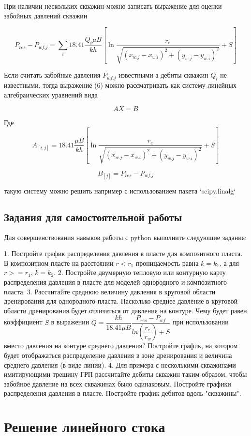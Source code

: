 \documentclass[a4paper,12pt]{article}
\begin{document}
	При наличии нескольких скважин можно записать выражение для оценки забойных давлений скважин
	
	
	$$
	P_{res} - P_{wf.j} =  \sum_{i} 18.41\dfrac{ Q_i\mu B }{kh} \left[ \ln\dfrac{r_e}{\sqrt{ (x_{w.j}-x_{w.i})^2 + (y_{w.j}-y_{w.i})^2 }} +S \right]
	$$
	
	Если считать забойные давления $P_{wf.j}$ известными а дебиты скважин $Q_i$ не известными, тогда выражение (6) можно рассматривать как систему линейных алгебраических уравнений вида
	
	$$AX = B$$
	
	Где
	$$
	A_{[i,j]} = 18.41\dfrac{ \mu B }{kh} \left[ \ln\dfrac{r_e}{\sqrt{ (x_{w.j}-x_{w.i})^2 + (y_{w.j}-y_{w.i})^2 }} +S \right]
	$$
	
	$$
	B_{[j]}=P_{res} - P_{wf.j}
	$$
	
	такую систему можно решить например с использованием пакета `scipy.linalg` 
	
	\subsection{Задания для самостоятельной работы}
	
	Для совершенствования навыков работы с python выполните следующие задания:
	
	1. Постройте график распределения давления в пласте для композитного пласта. В композитном пласте на расстоянии $r<r_1$ проницаемость равна $k=k_1$, а для $r>=r_1$, $k=k_2$. 
	2. Постройте двумерную тепловую или контурную карту распределения давления в пласте для моделей однородного и композитного пласта.
	3. Рассчитайте среднюю величину давления в круговой области дренирования для однородного пласта. Насколько среднее давление в круговой области дренирования будет отличаться от давления на контуре. Чему будет равен коэффициент $S$ в выражении  $Q=\dfrac{kh}{18.41\mu B} \dfrac{P_{res}-P_{wf}}{ln(\dfrac{r_e}{r_w})+S}$ при использовании вместо давления на контуре среднего давления? Постройте график, на котором будет отображаться распределение давления в зоне дренирования и величина среднего давления (в виде линии).
	4. Для примера с несколькими скважинами имитирующими трещину ГРП рассчитайте дебиты скважин таким образом, чтобы забойное давление на всех скважинах было одинаковым. Постройте графики распределения давления в пласте. Постройте график дебитов вдоль "скважины".
	
	\section{Решение линейного стока}
	
\end{document}

